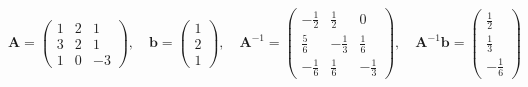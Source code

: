 \documentclass[11pt,a4paper]{article}
\def\bA{\mathbf{A}}
\def\bb{\mathbf{b}}
\begin{document}
\begin{enumerate}
{\begin{equation*}\bA =\left(
\begin{array}{ccc}
 1 & 2 & 1 \\
 3 & 2 & 1 \\
 1 & 0 & -3
\end{array}
\right),\quad \bb=\left(
\begin{array}{r}
 1 \\
 2 \\
 1
\end{array}
\right),
\quad\bA^{-1}=\left(
\begin{array}{rrr}
 -\frac{1}{2} & \frac{1}{2} &
   0 \\
 \frac{5}{6} & -\frac{1}{3} &
   \frac{1}{6} \\
 -\frac{1}{6} & \frac{1}{6} &
   -\frac{1}{3}
\end{array}
\right),\quad \bA^{-1}\bb = \left(
\begin{array}{r}
 \frac{1}{2} \\
 \frac{1}{3} \\
 -\frac{1}{6}
\end{array}
\right)
\end{equation*}

\noindent\hrulefill
}{}%


\end{enumerate}
\end{document}
